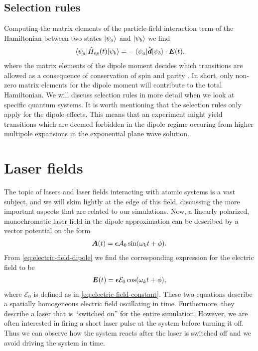         \subsection{Selection rules}
            Computing the matrix elements of the particle-field interaction term
            of the Hamiltonian between two states $\ket{\psi_{a}}$ and
            $\ket{\psi_{b}}$ we find
            \begin{align}
                \mel{\psi_{a}}{\hat{H}_{ep}(t)}{\psi_{b}}
                =
                - \mel{\psi_{a}}{\hat{\boldsymbol{d}}}{\psi_b}
                \cdot \boldsymbol{E}(t),
            \end{align}
            where the matrix elements of the dipole moment decides which
            transitions are allowed as a consequence of conservation of spin and
            parity \cite{modern-qm}.
            In short, only non-zero matrix elements for the dipole moment will
            contribute to the total Hamiltonian.
            We will discuss selection rules in more detail when we look at
            specific quantum systems.
            It is worth mentioning that the selection rules only apply for the
            dipole effects.
            This means that an experiment might yield transitions which are
            deemed forbidden in the dipole regime occuring from higher multipole
            expansions in the exponential plane wave solution.

    \section{Laser fields}
        The topic of lasers and laser fields interacting with atomic systems is
        a vast subject, and we will skim lightly at the edge of this field,
        discussing the more important aspects that are related to our
        simulations.
        Now, a linearly polarized, monochromatic laser field in the dipole
        approximation can be described by a vector potential on the form
        \cite{joachain2012atoms}
        \begin{align}
            \boldsymbol{A}(t) = \boldsymbol{\epsilon}\mathcal{A}_0
            \sin(\omega_k t + \phi). \\
        \end{align}
        From \autoref{eq:electric-field-dipole} we find the corresponding
        expression for the electric field to be
        \begin{align}
            \boldsymbol{E}(t) = \boldsymbol{\epsilon} \mathcal{E}_0
            \cos(\omega_k t + \phi),
        \end{align}
        where $\mathcal{E}_0$ is defined as in
        \autoref{eq:electric-field-constant}.
        These two equations describe a spatially homogeneous electric field
        oscillating in time.
        Furthermore, they describe a laser that is ``switched on'' for the
        entire simulation.
        However, we are often interested in firing a short laser pulse at the
        system before turning it off.
        Thus we can observe how the system reacts after the laser is switched
        off and we avoid driving the system in time.

